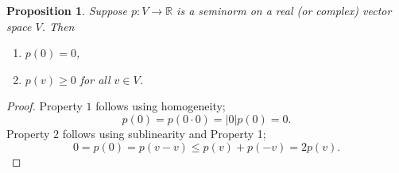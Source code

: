 \documentclass[12pt]{article}
\newcommand{\sR}[0]{\mathbb{R}}
\newtheorem{prop}{Proposition}
\begin{document}
\begin{prop}
Suppose $p\colon V\to \sR$ is a seminorm on a real (or complex) vector space $V$. 
Then 
\begin{enumerate}
\item $p(0)=0$,
\item $p(v)\ge 0$ for all $v\in V$.
\end{enumerate}
\end{prop}

\begin{proof} Property $1$ follows using homogeneity;
$$
  p(0)=p(0\cdot 0) = |0| p(0) =0.
$$
Property $2$ follows using sublinearity and Property 1;
$$ 
  0=p(0)=p(v-v) \le p(v)+p(-v) = 2p(v).
$$
\end{proof}
\end{document}
